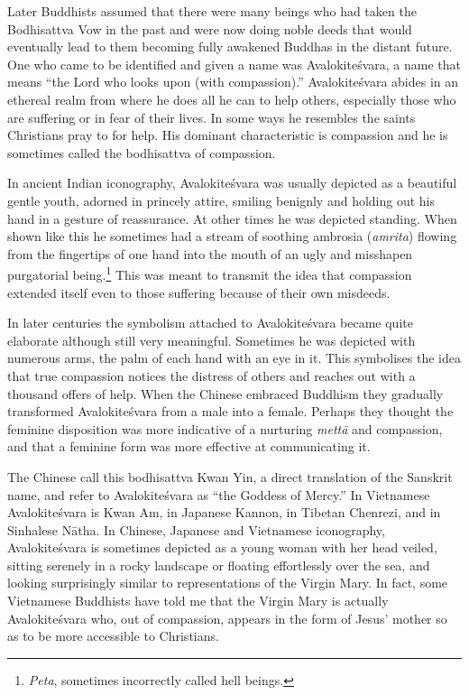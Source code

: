 \documentclass[10pt, openright]{book}
\begin{document}
Later Buddhists assumed that there were many beings who had taken the Bodhisattva Vow in the past and were now doing noble deeds that would eventually lead to them becoming fully awakened Buddhas in the distant future. One who came to be identified and given a name was Avalokiteśvara, a name that means “the Lord who looks upon (with compassion).” Avalokiteśvara abides in an ethereal realm from where he does all he can to help others, especially those who are suffering or in fear of their lives. In some ways he resembles the saints Christians pray to for help. His dominant characteristic is compassion and he is sometimes called the bodhisattva of compassion.


In ancient Indian iconography, Avalokiteśvara was usually depicted as a beautiful gentle youth, adorned in princely attire, smiling benignly and holding out his hand in a gesture of reassurance. At other times he was depicted standing. When shown like this he sometimes had a stream of soothing ambrosia (\textit{amrita}) flowing from the fingertips of one hand into the mouth of an ugly and misshapen purgatorial being.\footnote {\textit{Peta}, sometimes incorrectly called hell beings.} This was meant to transmit the idea that compassion extended itself even to those suffering because of their own misdeeds.


In later centuries the symbolism attached to Avalokiteśvara became quite elaborate although still very meaningful. Sometimes he was depicted with numerous arms, the palm of each hand with an eye in it. This symbolises the idea that true compassion notices the distress of others and reaches out with a thousand offers of help. When the Chinese embraced Buddhism they gradually transformed Avalokiteśvara from a male into a female. Perhaps they thought the feminine disposition was more indicative of a nurturing \textit{mettā} and compassion, and that a feminine form was more effective at communicating it.


The Chinese call this bodhisattva Kwan Yin, a direct translation of the Sanskrit name, and refer to Avalokiteśvara as “the Goddess of Mercy.” In Vietnamese Avalokiteśvara is Kwan Am, in Japanese Kannon, in Tibetan Chenrezi, and in Sinhalese Nātha. In Chinese, Japanese and Vietnamese iconography, Avalokiteśvara is sometimes depicted as a young woman with her head veiled, sitting serenely in a rocky landscape or floating effortlessly over the sea, and looking surprisingly similar to representations of the Virgin Mary. In fact, some Vietnamese Buddhists have told me that the Virgin Mary is actually Avalokiteśvara who, out of compassion, appears in the form of Jesus’ mother so as to be more accessible to Christians.
\end{document}
